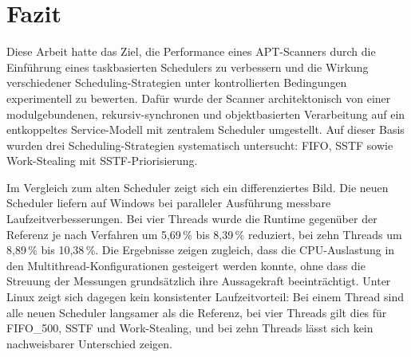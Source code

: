 \chapter{Fazit}
\label{ch:chapter05}

\begin{sloppypar}

\noindent Diese Arbeit hatte das Ziel, die Performance eines \acs{APT}-Scanners durch die Einführung eines taskbasierten Schedulers zu verbessern 
und die Wirkung verschiedener Scheduling-Strategien unter kontrollierten Bedingungen experimentell zu bewerten. 
Dafür wurde der Scanner architektonisch von einer modulgebundenen, rekursiv-synchronen und objektbasierten Verarbeitung 
auf ein entkoppeltes Service-Modell mit zentralem Scheduler umgestellt. 
Auf dieser Basis wurden drei Scheduling-Strategien systematisch untersucht: \acs{FIFO}, \acs{SSTF} sowie Work-Stealing mit \acs{SSTF}-Priorisierung.

\vspace{7.56mm}

\noindent Im Vergleich zum alten Scheduler zeigt sich ein differenziertes Bild. 
Die neuen Scheduler liefern auf Windows bei paralleler Ausführung messbare Laufzeitverbesserungen. 
Bei vier Threads wurde die Runtime gegenüber der Referenz je nach Verfahren um 5,69\,\% bis 8,39\,\% reduziert, 
bei zehn Threads um 8,89\,\% bis 10,38\,\%. 
Die Ergebnisse zeigen zugleich, dass die \acs{CPU}-Auslastung in den Multithread-Konfigurationen gesteigert werden konnte, 
ohne dass die Streuung der Messungen grundsätzlich ihre Aussagekraft beeinträchtigt. 
Unter Linux zeigt sich dagegen kein konsistenter Laufzeitvorteil: Bei einem Thread sind alle neuen Scheduler langsamer als die Referenz, 
bei vier Threads gilt dies für \acs{FIFO}\_500, \acs{SSTF} und Work-Stealing, 
und bei zehn Threads lässt sich kein nachweisbarer Unterschied zeigen.

\vspace{7.56mm}


\end{sloppypar}
